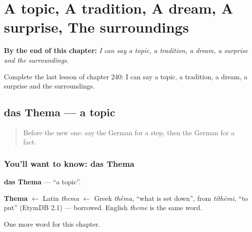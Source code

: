 
\chapter{A topic, A tradition, A dream, A surprise, The surroundings}
\label{ch:ge-a-topic-a-tradition-a-dream-a-surprise-the-surroundings}

\begin{chapteropening}
\textbf{By the end of this chapter:} \emph{I can say a topic, a tradition, a dream, a surprise and the surroundings.}

Complete the last lesson of chapter 240: I can say a topic, a tradition, a dream, a surprise and the surroundings.
\end{chapteropening}

\section[das Thema]{das Thema — a topic}

\label{lesson:GE-C240-thema}



\begin{quote}
Before the new one: say the German for a step, then the German for a fact.
\end{quote}

\subsection*{You'll want to know: das Thema}
\textbf{das Thema} — \textquotedblleft{}a topic\textquotedblright{}.

\begin{cousinweb}
\textbf{Thema} $\leftarrow$ Latin \emph{thema} $\leftarrow$ Greek \emph{théma}, \textquotedblleft{}what is set down\textquotedblright{}, from \emph{títhēmi}, \textquotedblleft{}to put\textquotedblright{} (EtymDB 2.1) — borrowed. English \emph{theme} is the same word.
\end{cousinweb}

\begin{grammarlens}[title={What you've built}]
One more word for this chapter.
\end{grammarlens}

